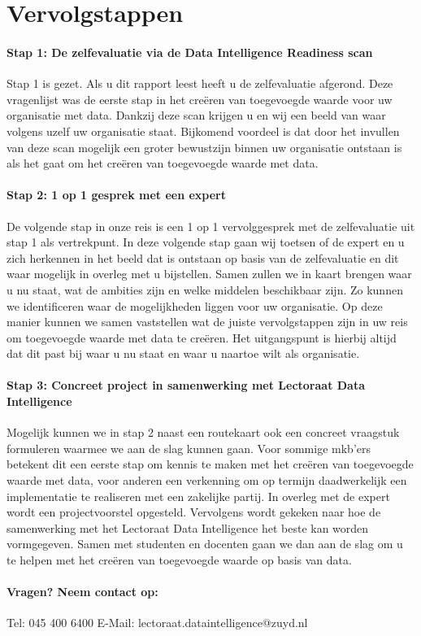 \chapter{Vervolgstappen}
\subsubsection{Stap 1: De zelfevaluatie via de Data Intelligence Readiness scan}

Stap 1 is gezet. Als u dit rapport leest heeft u de zelfevaluatie afgerond. Deze vragenlijst was de eerste stap in het creëren van toegevoegde waarde voor uw organisatie met data. Dankzij deze scan krijgen u en wij een beeld van waar volgens uzelf uw organisatie staat. Bijkomend voordeel is dat door het invullen van deze scan mogelijk een groter bewustzijn binnen uw organisatie ontstaan is als het gaat om het creëren van toegevoegde waarde met data. 

\subsubsection{Stap 2: 1 op 1 gesprek met een expert}

De volgende stap in onze reis is een 1 op 1 vervolggesprek met de zelfevaluatie uit stap 1 als vertrekpunt. In deze volgende stap gaan wij toetsen of de expert en u zich herkennen in het beeld dat is ontstaan op basis van de zelfevaluatie en dit waar mogelijk in overleg met u bijstellen. Samen zullen we in kaart brengen waar u nu staat, wat de ambities zijn en welke middelen beschikbaar zijn. Zo kunnen we identificeren waar de mogelijkheden liggen voor uw organisatie. Op deze manier kunnen we samen vaststellen wat de juiste vervolgstappen zijn in uw reis om toegevoegde waarde met data te creëren. Het uitgangspunt is hierbij altijd dat dit past bij waar u nu staat en waar u naartoe wilt als organisatie. 

\subsubsection{Stap 3: Concreet project in samenwerking met Lectoraat Data Intelligence}

Mogelijk kunnen we in stap 2 naast een routekaart ook een concreet vraagstuk formuleren waarmee we aan de slag kunnen gaan. Voor sommige mkb’ers betekent dit een eerste stap om kennis te maken met het creëren van toegevoegde waarde met data, voor anderen een verkenning om op termijn daadwerkelijk een implementatie te realiseren met een zakelijke partij. In overleg met de expert wordt een projectvoorstel opgesteld. Vervolgens wordt gekeken naar hoe de samenwerking met het Lectoraat Data Intelligence het beste kan worden vormgegeven. Samen met studenten en docenten gaan we dan aan de slag om u te helpen met het creëren van toegevoegde waarde op basis van data. 

\subsubsection{Vragen? Neem contact op:}

Tel: 045 400 6400 \newline
E-Mail: lectoraat.dataintelligence@zuyd.nl 